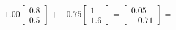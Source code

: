 \documentclass[preview]{standalone}
\begin{document}
\begin{align*}
1.00 \begin{bmatrix} 0.8 \\ 0.5 \end{bmatrix} + -0.75 \begin{bmatrix} 1 \\ 1.6 \end{bmatrix} = \begin{bmatrix} 0.05 \\ -0.71 \end{bmatrix} =
\end{align*}
\end{document}
